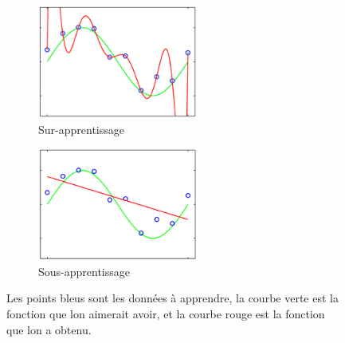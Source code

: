 \documentclass[11pt]{sdm}
\begin{document}
			\begin{figure}[!ht]
				\centering
				\begin{subfigure}{0.45\textwidth}
					\centering
					\includegraphics[natwidth=489,natheight=346,width=200,height=140]{figures/overfitting.png}
					\caption{Sur-apprentissage}
					\label{fig:overfitting}
				\end{subfigure}
				\hspace*{\fill}
				\begin{subfigure}{0.45\textwidth}	
					\centering
					\includegraphics[natwidth=508,natheight=360,width=200,height=140]{figures/underfitting.png}
					\caption{Sous-apprentissage}
					\label{fig:underfitting}
				\end{subfigure}
				\caption{Les points bleus sont les donn\'ees \`a apprendre, la courbe verte est la fonction que l\textquotesingle on aimerait avoir, et la courbe rouge est la fonction que l\textquotesingle on a obtenu.}
			\end{figure}
\end{document}
